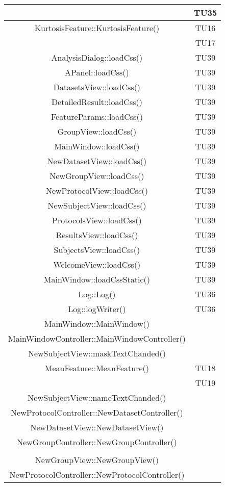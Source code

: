 \begin{center}
\begin{longtable}{|c|c|}
 & TU35 \\
\hline 
KurtosisFeature::KurtosisFeature() & TU16 \\
 & TU17 \\
\hline 
AnalysisDialog::loadCss() & TU39 \\
\hline 
APanel::loadCss() & TU39 \\
\hline 
DatasetsView::loadCss() & TU39 \\
\hline 
DetailedResult::loadCss() & TU39 \\
\hline 
FeatureParams::loadCss() & TU39 \\
\hline 
GroupView::loadCss() & TU39 \\
\hline 
MainWindow::loadCss() & TU39 \\
\hline 
NewDatasetView::loadCss() & TU39 \\
\hline 
NewGroupView::loadCss() & TU39 \\
\hline 
NewProtocolView::loadCss() & TU39 \\
\hline 
NewSubjectView::loadCss() & TU39 \\
\hline 
ProtocolsView::loadCss() & TU39 \\
\hline 
ResultsView::loadCss() & TU39 \\
\hline 
SubjectsView::loadCss() & TU39 \\
\hline 
WelcomeView::loadCss() & TU39 \\
\hline 
MainWindow::loadCssStatic() & TU39 \\
\hline 
Log::Log() & TU36 \\
\hline 
Log::logWriter() & TU36 \\
\hline 
MainWindow::MainWindow() &  \\
\hline 
MainWindowController::MainWindowController() &  \\
\hline 
NewSubjectView::maskTextChanded() &  \\
\hline 
MeanFeature::MeanFeature() & TU18 \\
 & TU19 \\
\hline 
NewSubjectView::nameTextChanded() &  \\
\hline 
NewProtocolController::NewDatasetController() &  \\
\hline 
NewDatasetView::NewDatasetView() &  \\
\hline 
NewGroupController::NewGroupController() &  \\
 &  \\
\hline 
NewGroupView::NewGroupView() &  \\
\hline 
NewProtocolController::NewProtocolController() &  \\

\end{longtable}
\end{center}
